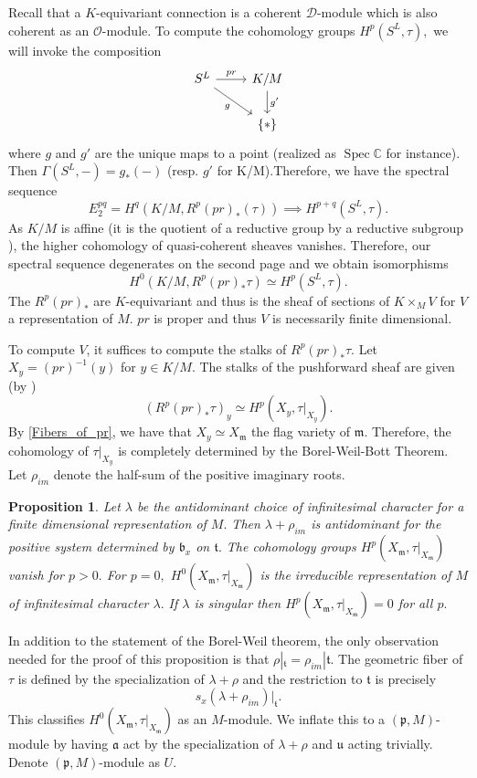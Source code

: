 \documentclass[letterpaper,twosided,11pt]{article}
\theoremstyle{plain}
\newtheorem{proposition}[theorem]{Proposition}
\theoremstyle{definition}
\theoremstyle{remark}
\newcommand{\C}{\mathbb{C}}
\newcommand{\lie}[1]{\mathfrak{#1}}
\begin{document}
Recall that a $K$-equivariant connection is a coherent $\mathcal{D}$-module which is also
 coherent as an $\mathcal{O}$-module. To compute the cohomology groups $H^p(S^L,\tau),$
  we will invoke the composition 
 \[\begin{tikzcd}
S^L \arrow[rd, "g"'] \arrow[r, "pr"] & K/M \arrow[d, "g'"] \\
                                     & \{*\}              
\end{tikzcd}\]
where $g$ and $g'$ are the unique maps to a point (realized as $\operatorname{Spec} \C$ for instance).  
Then $\Gamma(S^L,-)=g_*(-)$ (resp. $g'$ for K/M).Therefore, we have the 
spectral sequence \[ E_2^{pq}=H^q(K/M,R^p(pr)_*(\tau))\implies H^{p+q}(S^L,\tau). \]
As $K/M$ is affine (it is the quotient of a reductive group by a reductive subgroup
 \cite{Borel1991}), the higher cohomology of quasi-coherent sheaves vanishes. 
 Therefore, our spectral sequence degenerates on the second page and we
  obtain isomorphisms \[ H^{0}(K/M, R^p(pr)_*\tau)\simeq H^p(S^L,\tau). \]
The $R^p(pr)_*$ are $K$-equivariant and thus is the sheaf of sections of 
$K\times_M V$ for $V$ a representation of $M.$ $pr$ is proper and thus 
$V$ is necessarily finite dimensional. 

To compute $V$, it suffices to compute the stalks of $R^p(pr)_*\tau.$
 Let $X_y=(pr)^{-1}(y)$ for $y\in K/M.$ The stalks of the pushforward 
 sheaf are given 
 (by \cite[Proposition 8.1]{Hartshorne1977}) \[ (R^p(pr)_*\tau)_y\simeq H^p(X_y,\tau|_{X_y}). \]
By \ref{Fibers_of_pr}, we have that $X_y\simeq X_\lie{m}$ the flag variety of $\lie{m}.$ 
Therefore, the cohomology of $\tau|_{X_y}$ is completely determined by the Borel-Weil-Bott 
Theorem. Let $\rho_{im}$ denote the half-sum of the positive imaginary roots.  
\begin{proposition}
	Let $\lambda$ be the antidominant choice of infinitesimal character for a 
	finite dimensional representation of $M.$ Then $\lambda+\rho_{im}$ is 
	antidominant for the positive system determined by $\lie{b}_x$ on $\lie{t}.$
	 The cohomology groups $H^p(X_\lie{m},\tau|_{X_\lie{m}})$ vanish for $p>0.$
	  For $p=0,$ $H^0(  X_\lie{m},\tau|_{X_\lie{m}})$ is the irreducible 
	  representation of $M$ of infinitesimal character $\lambda.$ If $\lambda$
	   is singular then $H^p( X_\lie{m},\tau|_{X_\lie{m}})=0$ for all $p.$
\end{proposition} 
In addition to the statement of the Borel-Weil theorem, the only observation
 needed for the proof of this proposition is that $\rho|_\lie{t}=\rho_{im}|\lie{t}.$
  The geometric fiber of $\tau$ is defined by the specialization of $\lambda+\rho$
   and the restriction to $\lie{t}$ is precisely \[ s_x(\lambda+\rho_{im})|_\lie{t}.\] 
   This classifies $H^0( X_\lie{m},\tau|_{X_\lie{m}})$ as an $M$-module. We inflate
    this to a $(\lie{p},M)$-module by having $\lie{a}$ act by the specialization
     of $\lambda+\rho$ and $\lie{u}$ acting trivially. Denote $(\lie{p},M)$-module as $U.$   
  
\end{document}
